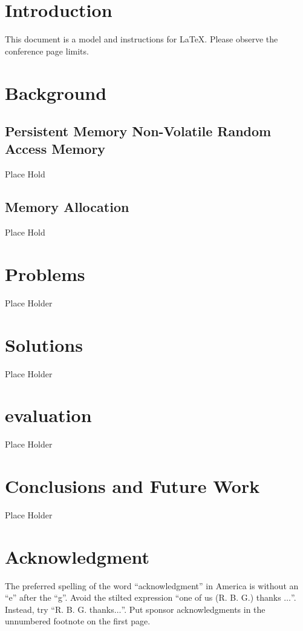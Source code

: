 \documentclass[conference]{IEEEtran}
\begin{document}
\section{Introduction}
This document is a model and instructions for \LaTeX.
Please observe the conference page limits. 

\section{Background}

\subsection{Persistent Memory Non-Volatile Random Access Memory}
Place Hold

\subsection{Memory Allocation}
Place Hold





\section{Problems}
Place Holder

\section{Solutions}
Place Holder

\section{evaluation}
Place Holder

\section{Conclusions and Future Work}
Place Holder

\section*{Acknowledgment}

The preferred spelling of the word ``acknowledgment'' in America is without 
an ``e'' after the ``g''. Avoid the stilted expression ``one of us (R. B. 
G.) thanks $\ldots$''. Instead, try ``R. B. G. thanks$\ldots$''. Put sponsor 
acknowledgments in the unnumbered footnote on the first page.
\end{document}

